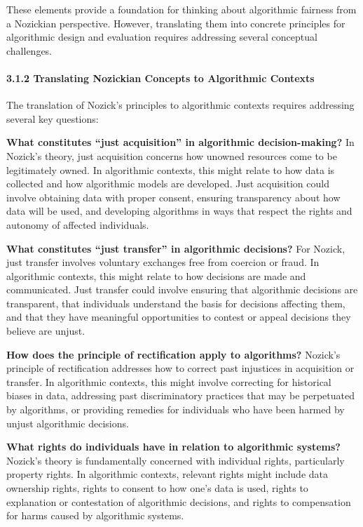 These elements provide a foundation for thinking about algorithmic
fairness from a Nozickian perspective. However, translating them into
concrete principles for algorithmic design and evaluation requires
addressing several conceptual challenges.

\paragraph{3.1.2 Translating Nozickian Concepts to Algorithmic
Contexts}\label{translating-nozickian-concepts-to-algorithmic-contexts}

The translation of Nozick's principles to algorithmic contexts requires
addressing several key questions:

\textbf{What constitutes ``just acquisition'' in algorithmic
decision-making?} In Nozick's theory, just acquisition concerns how
unowned resources come to be legitimately owned. In algorithmic
contexts, this might relate to how data is collected and how algorithmic
models are developed. Just acquisition could involve obtaining data with
proper consent, ensuring transparency about how data will be used, and
developing algorithms in ways that respect the rights and autonomy of
affected individuals.

\textbf{What constitutes ``just transfer'' in algorithmic decisions?}
For Nozick, just transfer involves voluntary exchanges free from
coercion or fraud. In algorithmic contexts, this might relate to how
decisions are made and communicated. Just transfer could involve
ensuring that algorithmic decisions are transparent, that individuals
understand the basis for decisions affecting them, and that they have
meaningful opportunities to contest or appeal decisions they believe are
unjust.

\textbf{How does the principle of rectification apply to algorithms?}
Nozick's principle of rectification addresses how to correct past
injustices in acquisition or transfer. In algorithmic contexts, this
might involve correcting for historical biases in data, addressing past
discriminatory practices that may be perpetuated by algorithms, or
providing remedies for individuals who have been harmed by unjust
algorithmic decisions.

\textbf{What rights do individuals have in relation to algorithmic
systems?} Nozick's theory is fundamentally concerned with individual
rights, particularly property rights. In algorithmic contexts, relevant
rights might include data ownership rights, rights to consent to how
one's data is used, rights to explanation or contestation of algorithmic
decisions, and rights to compensation for harms caused by algorithmic
systems.

